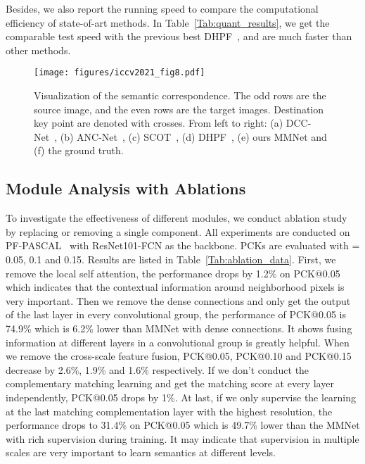 Besides, we also report the running speed to compare the computational efficiency of state-of-art methods. In Table~\ref{Tab:quant_results}, we get the comparable test speed with the previous best DHPF~\cite{min2020learning}, and are much faster than other methods.

\begin{figure*}[t]
	\centering
	\texttt{[image: figures/iccv2021\_fig8.pdf]}
	\caption{Visualization of the semantic correspondence. The odd rows are the source image, and the even rows are the target images. Destination key point are denoted with crosses. From left to right: (a) DCC-Net~\cite{dccnet}, (b) ANC-Net~\cite{li2020correspondence}, (c) SCOT~\cite{liu2020semantic}, (d) DHPF~\cite{min2020learning}, (e) ours MMNet and (f) the ground truth.}
	\label{Fig:msmc}
\end{figure*}

\subsection{Module Analysis with Ablations}\label{ablations}
To investigate the effectiveness of different modules, we conduct ablation study by replacing or removing a single component. All experiments are conducted on PF-PASCAL~\cite{ham2017proposal} with ResNet101-FCN as the backbone. PCKs are evaluated with  = 0.05, 0.1 and 0.15. Results are listed in Table~\ref{Tab:ablation_data}. First, we remove the local self attention, the performance drops by 1.2\% on PCK@0.05 which indicates that the contextual information around neighborhood pixels is very important. Then we remove the dense connections and only get the output of the last layer in every convolutional group, the performance of PCK@0.05 is 74.9\% which is 6.2\% lower than MMNet with dense connections. It shows fusing information at different layers in a convolutional group is greatly helpful. When we remove the cross-scale feature fusion, PCK@0.05, PCK@0.10 and PCK@0.15 decrease by 2.6\%, 1.9\% and 1.6\% respectively. If we don't conduct the complementary matching learning and get the matching score at every layer independently, PCK@0.05 drops by 1\%. At last, if we only supervise the learning at the last matching complementation layer with the highest resolution, the performance drops to 31.4\% on PCK@0.05 which is 49.7\% lower than the MMNet with rich supervision during training. It may indicate that supervision in multiple scales are very important to learn semantics at different levels.  




